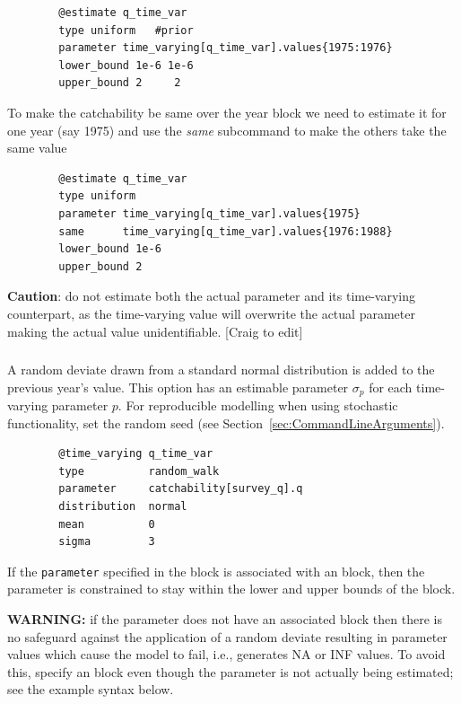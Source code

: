 {\small{\begin{verbatim}
		@estimate q_time_var
		type uniform   #prior
		parameter time_varying[q_time_var].values{1975:1976}
		lower_bound 1e-6 1e-6
		upper_bound 2     2
		\end{verbatim}}}

To make the catchability be same over the year block we need to estimate it for one year (say 1975) and use the \textit{same} subcommand to make the others take the same value

{\small{\begin{verbatim}
		@estimate q_time_var
		type uniform
		parameter time_varying[q_time_var].values{1975}
		same      time_varying[q_time_var].values{1976:1988}
		lower_bound 1e-6
		upper_bound 2
		\end{verbatim}}}

\textbf{Caution}: do not estimate both the actual parameter and its time-varying counterpart, as the time-varying value will overwrite the actual parameter making the actual value unidentifiable. [Craig to edit]

\subsubsection[Random Walk]{}\label{sec:TimeVarying-RandomWalk}

A random deviate drawn from a standard normal distribution is added to the previous year's value. This option has an estimable parameter $\sigma_p$ for each time-varying parameter $p$. For reproducible modelling when using stochastic functionality, set the random seed (see Section~\ref{sec:CommandLineArguments}).

{\small{\begin{verbatim}
		@time_varying q_time_var
		type          random_walk
		parameter     catchability[survey_q].q
		distribution  normal
		mean          0
		sigma         3
		\end{verbatim}}}

If the \texttt{parameter} specified in the  block is associated with an  block, then the parameter is constrained to stay within the lower and upper bounds of the  block.

\textbf{WARNING:} if the parameter does not have an associated  block then there is no safeguard against the application of a random deviate resulting in parameter values which cause the model to fail, i.e., generates NA or INF values. To avoid this, specify an  block even though the parameter is not actually being estimated; see the example syntax below.

